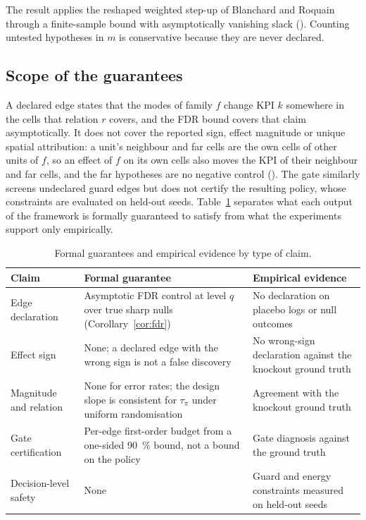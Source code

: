The result applies the reshaped weighted step-up of Blanchard and Roquain~\cite[Thm.~4.2]{blanchard2008fdr}
 through a finite-sample bound with asymptotically vanishing slack
(). Counting untested hypotheses in $m$ is conservative because they are never declared.

\subsection{Scope of the guarantees}
\label{sec:reading}

A declared edge states that the modes of family $f$ change KPI $k$ somewhere in the cells that relation $r$ covers,
and the FDR bound covers that claim asymptotically. It does not cover the reported sign, effect magnitude or unique
spatial attribution: a unit's neighbour and far cells are the own cells of other units of $f$, so an effect of $f$ on
its own cells also moves the KPI of their neighbour and far cells, and the far hypotheses are no negative control
(). The gate similarly screens undeclared guard edges but does not certify the resulting policy,
whose constraints are evaluated on held-out seeds. Table~\ref{tab:guarantees} separates what each output of the
framework is formally guaranteed to satisfy from what the experiments support only empirically.

\begin{table}[tbp]
\caption{Formal guarantees and empirical evidence by type of claim.}
\label{tab:guarantees}
\footnotesize
\setlength{\tabcolsep}{3pt}
\begin{tabular*}{\textwidth}{@{\extracolsep\fill}>{\raggedright}p{}>{\raggedright}p{}>{\raggedright\arraybackslash}p{}@{}}
\toprule
Claim & Formal guarantee & Empirical evidence \\
\midrule
Edge declaration & Asymptotic FDR control at level $q$ over true sharp nulls (Corollary~\ref{cor:fdr}) & No declaration
on placebo logs or null outcomes \\
Effect sign & None; a declared edge with the wrong sign is not a false discovery & No wrong-sign declaration against the
knockout ground truth \\
Magnitude and relation & None for error rates; the design slope is consistent for $\tau_{\pi}$ under uniform
randomisation & Agreement with the knockout ground truth \\
Gate certification & Per-edge first-order budget from a one-sided 90~\% bound, not a bound on the policy & Gate
diagnosis against the ground truth \\
Decision-level safety & None & Guard and energy constraints measured on held-out seeds \\
\bottomrule
\end{tabular*}
\end{table}

